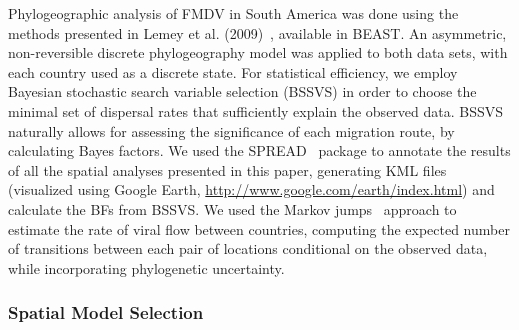 \documentclass[10pt]{article}
\begin{document}
Phylogeographic analysis of FMDV in South America was done using the methods presented in Lemey et al. (2009)~\cite{roots}, available in BEAST. 
An asymmetric, non-reversible discrete phylogeography model was applied to both data sets, with each country used as a discrete state.
For statistical efficiency, we employ Bayesian stochastic search variable selection (BSSVS) in order to choose the minimal set of dispersal rates that sufficiently explain the observed data.
BSSVS naturally allows for assessing the significance of each migration route, by calculating Bayes factors.
We used the SPREAD~\cite{spread} package to annotate the results of all the spatial analyses presented in this paper, generating KML files (visualized using Google Earth, \url{http://www.google.com/earth/index.html}) and calculate the BFs from BSSVS.
We used the Markov jumps~\cite{Minin2008} approach to estimate the rate of viral flow between countries, computing the expected number of transitions between each pair of locations conditional on the observed data, while incorporating phylogenetic uncertainty.

\subsubsection*{Spatial Model Selection}
\end{document}
